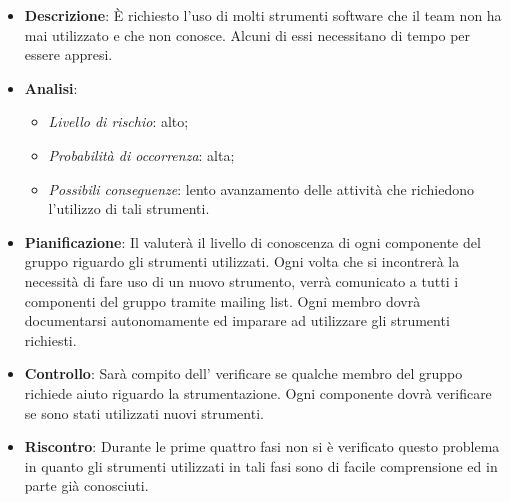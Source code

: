 			\begin{itemize}
				\item \textbf{Descrizione}: È richiesto l'uso di molti strumenti software che il team non ha mai utilizzato e che non conosce. Alcuni di essi necessitano di tempo per essere appresi.
				\item \textbf{Analisi}:
				\begin{itemize}
					\item \textit{Livello di rischio}: alto;
					\item \textit{Probabilità di occorrenza}: alta;
					\item \textit{Possibili conseguenze}: lento avanzamento delle attività che richiedono l'utilizzo di tali strumenti.
				\end{itemize}
				\item \textbf{Pianificazione}: Il  valuterà il livello di conoscenza di ogni componente del gruppo riguardo gli strumenti utilizzati. Ogni volta che si incontrerà la necessità di fare uso di un nuovo strumento, verrà comunicato a tutti i componenti del gruppo tramite mailing list. Ogni membro dovrà documentarsi autonomamente ed imparare ad utilizzare gli strumenti richiesti.
				\item \textbf{Controllo}: Sarà compito dell' verificare se qualche membro del gruppo richiede aiuto riguardo la strumentazione. Ogni componente dovrà verificare se sono stati utilizzati nuovi strumenti.
				\item \textbf{Riscontro}: Durante le prime quattro fasi non si è verificato questo problema in quanto gli strumenti utilizzati in tali fasi sono di facile comprensione ed in parte già conosciuti.
			\end{itemize}
